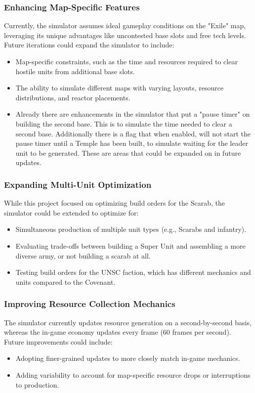 \documentclass[a4paper, 12pt, english]{article}
\begin{document}
\subsubsection{Enhancing Map-Specific Features}
Currently, the simulator assumes ideal gameplay conditions on the "Exile" map, leveraging its unique advantages like uncontested base slots and free tech levels. Future iterations could expand the simulator to include:
    \begin{itemize}
    \item Map-specific constraints, such as the time and resources required to clear hostile units from additional base slots.
    \item The ability to simulate different maps with varying layouts, resource distributions, and reactor placements.
    \item Already there are enhancements in the simulator that put a "pause timer" on building the second base. This is to simulate the time needed to clear a second base. Additionally there is a flag that when enabled, will not start the pause timer until a Temple has been built, to simulate waiting for the leader unit to be generated. These are areas that could be expanded on in future updates. 
    \end{itemize}


\subsubsection{Expanding Multi-Unit Optimization}
While this project focused on optimizing build orders for the Scarab, the simulator could be extended to optimize for:
    \begin{itemize}
    \item Simultaneous production of multiple unit types (e.g., Scarabs and infantry).
    \item Evaluating trade-offs between building a Super Unit and assembling a more diverse army, or not building a scarab at all.
    \item Testing build orders for the UNSC faction, which has different mechanics and units compared to the Covenant.
    \end{itemize}


\subsubsection{Improving Resource Collection Mechanics}
The simulator currently updates resource generation on a second-by-second basis, whereas the in-game economy updates every frame (60 frames per second). Future improvements could include:
    \begin{itemize}
    \item Adopting finer-grained updates to more closely match in-game mechanics.
    \item Adding variability to account for map-specific resource drops or interruptions to production.
    \end{itemize}
\end{document}

